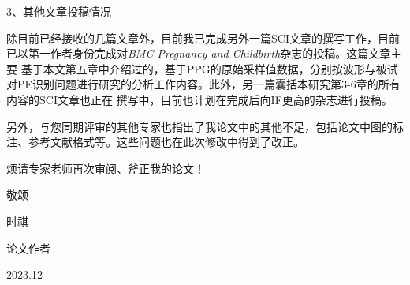 3、其他文章投稿情况

除目前已经接收的几篇文章外，目前我已完成另外一篇SCI文章的撰写工作，目前已以第一作者身份完成对\textit{BMC Pregnancy and Childbirth}杂志的投稿。这篇文章主要
基于本文第五章中介绍过的，基于PPG的原始采样值数据，分别按波形与被试对PE识别问题进行研究的分析工作内容。此外，另一篇囊括本研究第3-6章的所有内容的SCI文章也正在
撰写中，目前也计划在完成后向IF更高的杂志进行投稿。

\bigskip
\bigskip
另外，与您同期评审的其他专家也指出了我论文中的其他不足，包括论文中图的标注、参考文献格式等。这些问题也在此次修改中得到了改正。

烦请专家老师再次审阅、斧正我的论文！

敬颂

\noindent
时祺

\begin{flushright}
论文作者

2023.12
\end{flushright}
